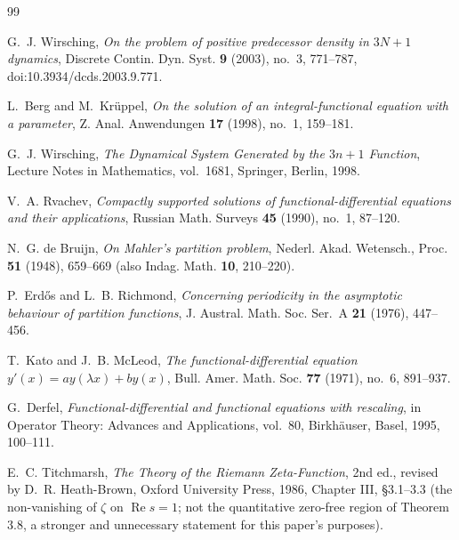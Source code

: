 \documentclass[11pt]{amsart}
\theoremstyle{plain}
\theoremstyle{definition}
\theoremstyle{remark}
\begin{document}
\begin{thebibliography}{99}

G.~J. Wirsching, \emph{On the problem of positive predecessor density in $3N+1$ dynamics},
Discrete Contin. Dyn. Syst. \textbf{9} (2003), no.~3, 771--787, doi:10.3934/dcds.2003.9.771.

L.~Berg and M.~Kr\"uppel, \emph{On the solution of an integral-functional equation with a
parameter}, Z. Anal. Anwendungen \textbf{17} (1998), no.~1, 159--181.

G.~J. Wirsching, \emph{The Dynamical System Generated by the $3n+1$ Function}, Lecture Notes in
Mathematics, vol.~1681, Springer, Berlin, 1998.

V.~A. Rvachev, \emph{Compactly supported solutions of functional-differential equations and their
applications}, Russian Math. Surveys \textbf{45} (1990), no.~1, 87--120.

N.~G. de Bruijn, \emph{On Mahler's partition problem}, Nederl. Akad. Wetensch., Proc.
\textbf{51} (1948), 659--669 (also Indag. Math. \textbf{10}, 210--220).

P.~Erd\H{o}s and L.~B. Richmond, \emph{Concerning periodicity in the asymptotic behaviour of
partition functions}, J. Austral. Math. Soc. Ser.~A \textbf{21} (1976), 447--456.

T.~Kato and J.~B. McLeod, \emph{The functional-differential equation $y'(x) = ay(\lambda x) +
by(x)$}, Bull. Amer. Math. Soc. \textbf{77} (1971), no.~6, 891--937.

G.~Derfel, \emph{Functional-differential and functional equations with rescaling}, in Operator
Theory: Advances and Applications, vol.~80, Birkh\"auser, Basel, 1995, 100--111.

E.~C. Titchmarsh, \emph{The Theory of the Riemann Zeta-Function}, 2nd ed., revised by D.~R.
Heath-Brown, Oxford University Press, 1986, Chapter III, \S3.1--3.3 (the non-vanishing of $\zeta$
on $\operatorname{Re}s=1$; not the quantitative zero-free region of Theorem 3.8, a stronger and
unnecessary statement for this paper's purposes).

\end{thebibliography}
\end{document}
